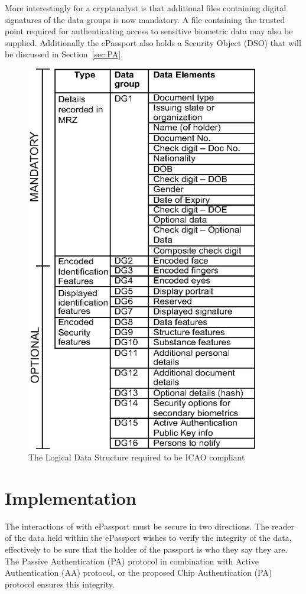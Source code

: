 \documentclass[12pt]{article}
\begin{document}
More interestingly for a cryptanalyst is that  additional files containing digital signatures of the data groups is now mandatory. A file containing the trusted point required for authenticating access to sensitive biometric data may also be supplied. Additionally the ePassport also holds a Security Object (DSO) that will be discussed in Section~\ref{sec:PA}.

\begin{figure}
\centering
\includegraphics[width=4in]{LDS.eps}
\caption{The Logical Data Structure required to be ICAO compliant \cite{Anonymous:2006vu}}
\label{fig:LDS}
\end{figure}

\section{Implementation}
The interactions of with ePassport must be secure in two directions. The reader of the data held within the ePassport wishes to verify the integrity of the data, effectively to be sure that the holder of the passport is who they say they are. The Passive Authentication (PA) protocol in combination with Active Authentication (AA) protocol, or the proposed Chip Authentication (PA) protocol ensures this integrity.
\end{document}
